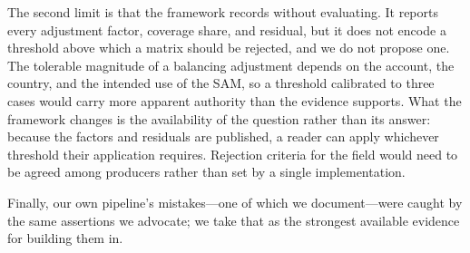The second limit is that the framework records without evaluating. It
reports every adjustment factor, coverage share, and residual, but it
does not encode a threshold above which a matrix should be rejected, and
we do not propose one. The tolerable magnitude of a balancing adjustment
depends on the account, the country, and the intended use of the SAM, so
a threshold calibrated to three cases would carry more apparent authority
than the evidence supports. What the framework changes is the
availability of the question rather than its answer: because the factors
and residuals are published, a reader can apply whichever threshold their
application requires. Rejection criteria for the field would need to be
agreed among producers rather than set by a single implementation.

Finally, our own pipeline's mistakes---one of which we document---were
caught by the same assertions we advocate; we take that as the strongest
available evidence for building them in.

